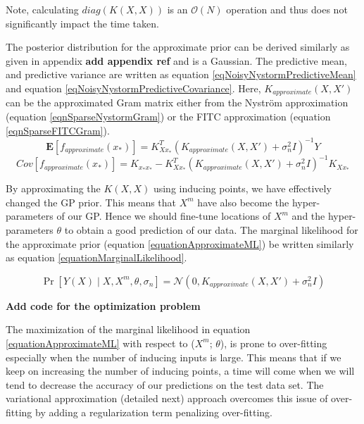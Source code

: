 Note, calculating $diag(K(X, X))$ is an $\mathcal{O}\left ( N \right )$ operation and thus does not significantly impact the time taken. 

The posterior distribution for the approximate prior can be derived similarly as given in appendix \textbf{add appendix ref} and is a Gaussian. The predictive mean, and predictive variance are written as equation \ref{eqNoisyNystormPredictiveMean} and equation \ref{eqNoisyNystormPredictiveCovariance}. Here, $K_{approximate}(X, X')$ can be the approximated Gram matrix either from the Nystr\"{o}m approximation (equation \ref{eqnSparseNystormGram}) or the FITC approximation (equation \ref{eqnSparseFITCGram}). 
\begin{equation}\label{eqNoisyNystormPredictiveMean}
  \mathbf{E}[f_{approximate}(x_{*})] = K_{Xx_{*}}^{T}( K_{approximate}(X, X') + \sigma^{2}_{n}I)^{-1}Y
  \end{equation}
\begin{equation}\label{eqNoisyNystormPredictiveCovariance}
	Cov[f_{approximate}(x_{*})] = K_{x_{*}x_{*}} - K_{Xx_{*}}^{T}( K_{approximate}(X, X') + \sigma^{2}_{n}I )^{-1} K_{Xx_{*}}
  \end{equation}


By approximating the $K(X, X)$ using inducing points, we have effectively changed the GP prior. This means that $X^{m}$ have also become the hyper-parameters of our GP. Hence we should fine-tune locations of $X^{m}$ and the hyper-parameters $\theta$ to obtain a good prediction of our data. The marginal likelihood for the approximate prior (equation \ref{equationApproximateML}) be written similarly as equation \ref{equationMarginalLikelihood}.

\begin{equation}\label{equationApproximateML}
    \Pr[Y(X) \mid X, X^{m}, \theta, \sigma_{n}] = \mathcal{N}(0 , K_{approximate}(X, X') + \sigma^{2}_{n}I)
\end{equation}

\textbf{Add code for the optimization problem}

The maximization of the marginal likelihood in equation \ref{equationApproximateML} with respect to ($X^{m}$; $\theta$), is prone to over-fitting especially when the number of inducing inputs is large. This means that if we keep on increasing the number of inducing points, a time will come when we will tend to decrease the accuracy of our predictions on the test data set. The variational approximation (detailed next) approach overcomes this issue of over-fitting by adding a regularization term penalizing over-fitting.

